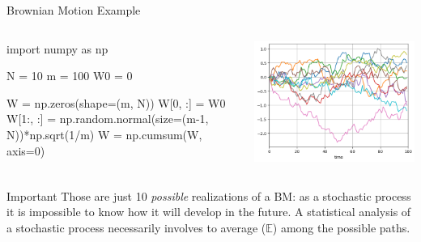 \documentclass{beamer}
\begin{document}
\begin{frame}[fragile]{Brownian Motion Example}
\begin{columns}
\begin{ipython}
import numpy as np

N = 10
m = 100
W0 = 0

W = np.zeros(shape=(m, N))
W[0, :] = W0
W[1:, :] = np.random.normal(size=(m-1, N))*np.sqrt(1/m)
W = np.cumsum(W, axis=0)
\end{ipython}
\begin{center}    
    \includegraphics[width=1.\linewidth]{images/bm_realizations}
\end{center}
\end{columns}
\begin{block}{Important}
Those are just 10 \emph{possible} realizations of a  BM: as a stochastic process it is impossible to know how it will develop in the future. A statistical analysis of a stochastic process necessarily involves to average ($\mathbb{E}$) among the possible paths.
\end{block}
\end{frame}
\end{document}
